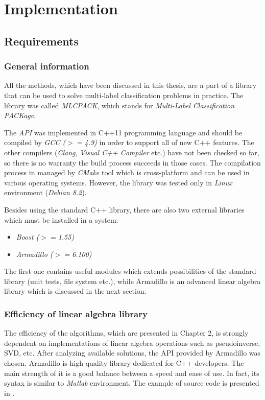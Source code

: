 \documentclass[english,a4paper,twoside]{ppfcmthesis}
\begin{document}
\chapter{Implementation}

\section{Requirements}

\subsection{General information}
All the methods, which have been discussed in this thesis, are a part of a library that can be used to solve multi-label classification problems in practice. The library was called \textit{MLCPACK}, which stands for \textit{Multi-Label Classification PACKage}. 

The \textit{API} was implemented in C++11 programming language and should be compiled by \textit{GCC ($>=$4.9)} in order to support all of new C++ features. The other compilers (\textit{Clang}, \textit{Visual C++ Compiler} etc.) have not been checked so far, so there is no warranty the build process succeeds in those cases.  The compilation process in managed by \textit{CMake} tool \citep{CMake} which is cross-platform and can be used in various operating systems. However, the library was tested only in \textit{Linux} environment (\textit{Debian 8.2}). 

Besides using the standard C++ library, there are also two external libraries which must be installed in a system: 

\begin{itemize}
    \item \textit{Boost ($>=$1.55)}
    \item \textit{Armadillo ($>=$6.100)}
\end{itemize}
The first one contains useful modules which extends possibilities of the standard library (unit tests, file system etc.), while Armadillo is an advanced linear algebra library which is discussed in the next section.  


\subsection{Efficiency of linear algebra library}

The efficiency of the algorithms, which are presented in Chapter 2, is strongly dependent on implementations of linear algebra operations such as pseudoinverse, SVD, etc. After analyzing available solutions, the API provided by Armadillo was chosen. Armadillo is high-quality library dedicated for C++ developers. The main strength of it is a good balance between a speed and ease of use. In fact, its syntax is similar to \textit{Matlab} environment. The example of source code is presented in .
\end{document}
